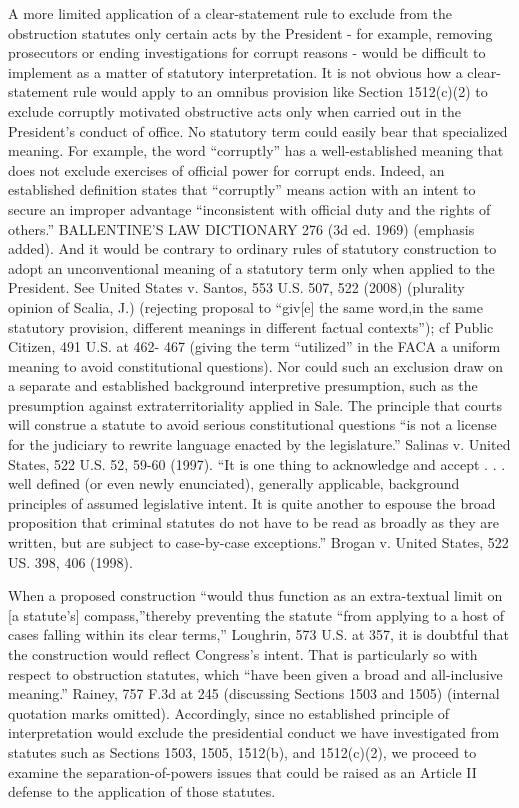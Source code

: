 A more limited application of a clear-statement rule to exclude from the obstruction statutes
only certain acts by the President - for example, removing prosecutors or ending investigations
for corrupt reasons - would be difficult to implement as a matter of statutory interpretation. It is
not obvious how a clear-statement rule would apply to an omnibus provision like Section
1512(c)(2) to exclude corruptly motivated obstructive acts only when carried out in the President’s
conduct of office. No statutory term could easily bear that specialized meaning. For example, the
word “corruptly” has a well-established meaning that does not exclude exercises of official power
for corrupt ends. Indeed, an established definition states that “corruptly” means action with an
intent to secure an improper advantage “inconsistent with official duty and the rights of others.”
BALLENTINE’S LAW DICTIONARY 276 (3d ed. 1969) (emphasis added). And it would be contrary
to ordinary rules of statutory construction to adopt an unconventional meaning of a statutory term
only when applied to the President. See United States v. Santos, 553 U.S. 507, 522 (2008)
(plurality opinion of Scalia, J.) (rejecting proposal to “giv[e] the same word,in the same statutory
provision, different meanings in different factual contexts”); cf Public Citizen, 491 U.S. at 462-
467 (giving the term “utilized” in the FACA a uniform meaning to avoid constitutional questions).
Nor could such an exclusion draw on a separate and established background interpretive
presumption, such as the presumption against extraterritoriality applied in Sale. The principle that
courts will construe a statute to avoid serious constitutional questions “is not a license for the
judiciary to rewrite language enacted by the legislature.” Salinas v. United States, 522 U.S. 52,
59-60 (1997). “It is one thing to acknowledge and accept . . . well defined (or even newly
enunciated), generally applicable, background principles of assumed legislative intent. It is quite
another to espouse the broad proposition that criminal statutes do not have to be read as broadly
as they are written, but are subject to case-by-case exceptions.” Brogan v. United States, 522 US.
398, 406 (1998).

When a proposed construction “would thus function as an extra-textual limit on [a statute’s]
compass,”thereby preventing the statute “from applying to a host of cases falling within its clear
terms,” Loughrin, 573 U.S. at 357, it is doubtful that the construction would reflect Congress’s
intent. That is particularly so with respect to obstruction statutes, which “have been given a broad
and all-inclusive meaning.” Rainey, 757 F.3d at 245 (discussing Sections 1503 and 1505) (internal
quotation marks omitted). Accordingly, since no established principle of interpretation would
exclude the presidential conduct we have investigated from statutes such as Sections 1503, 1505,
1512(b), and 1512(c)(2), we proceed to examine the separation-of-powers issues that could be
raised as an Article II defense to the application of those statutes.


